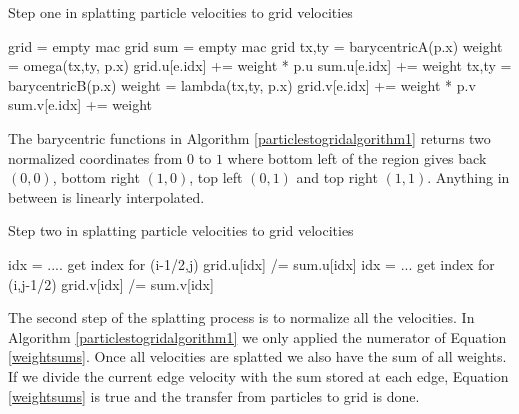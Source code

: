 \begin{algorithm}
\caption{Step one in splatting particle velocities to grid velocities}
\begin{algorithmic}
\STATE grid = empty mac grid
\STATE sum = empty mac grid
\STATE tx,ty = barycentricA(p.x)
\STATE weight = omega(tx,ty, p.x)
\STATE grid.u[e.idx] += weight * p.u
\STATE sum.u[e.idx] += weight
\ENDFOR
\STATE tx,ty = barycentricB(p.x)
\STATE weight = lambda(tx,ty, p.x)
\STATE grid.v[e.idx] += weight * p.v
\STATE sum.v[e.idx] += weight
\ENDFOR
\ENDFOR
\end{algorithmic}
\label{particlestogridalgorithm1}
\end{algorithm}
\newline
\newline
\noindent
The barycentric functions in Algorithm \ref{particlestogridalgorithm1} returns two normalized coordinates from $0$ to $1$ where bottom left of the region gives back $(0,0)$, bottom right $(1,0)$, top left $(0,1)$ and top right $(1,1)$. Anything in between is linearly interpolated.
\begin{algorithm}
\caption{Step two in splatting particle velocities to grid velocities}
\begin{algorithmic}
\STATE idx = .... get index for (i-1/2,j)
\STATE grid.u[idx] /= sum.u[idx]
\STATE idx = ... get index for (i,j-1/2)
\STATE grid.v[idx] /= sum.v[idx]
\ENDFOR
\ENDFOR
\end{algorithmic}
\label{particlestogridalgorithm2}
\end{algorithm}
\newline
\newline
\noindent
The second step of the splatting process is to normalize all the velocities. In Algorithm \ref{particlestogridalgorithm1} we only applied the numerator of Equation \ref{weightsums}. Once all velocities are splatted we also have the sum of all weights. If we divide the current edge velocity with the sum stored at each edge,  Equation \ref{weightsums} is true and the transfer from particles to grid is done.
